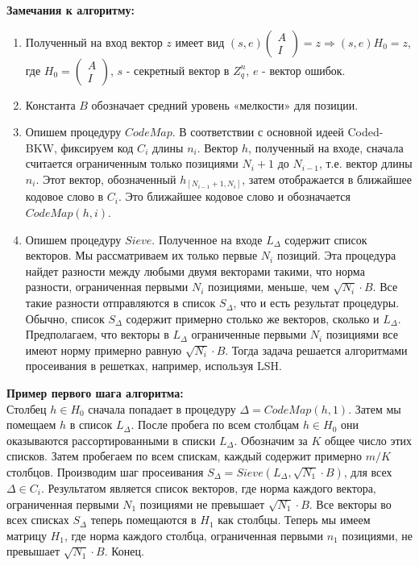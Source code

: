 \documentclass[a4paper,11pt]{article}
\begin{document}
\textbf{Замечания к алгоритму:}\\
\begin{enumerate}
\item Полученный на вход вектор $z$ имеет вид $(s,e)\begin{pmatrix} A\\ I \end{pmatrix} = z \Rightarrow (s,e)H_0 = z$, где $H_0 = \begin{pmatrix} A\\ I \end{pmatrix}$, $s$ - секретный вектор в $Z^{n}_q$, $e$ - вектор ошибок.
\item Константа $B$ обозначает средний уровень «мелкости» для позиции.
\item Опишем процедуру $CodeMap$. В соответствии с основной идеей Coded-BKW, фиксируем код $C_i$ длины $n_i$. Вектор $h$, полученный на входе, сначала считается ограниченным только позициями $N_i+1$ до $N_{i-1}$, т.е. вектор длины $n_i$. Этот вектор, обозначенный $h_{[N_{i-1}+1,N_i]}$, затем отображается в ближайшее кодовое слово в $C_i$. Это ближайшее кодовое слово и обозначается $CodeMap(h,i)$.
\item Опишем процедуру $Sieve$. Полученное на входе $L_{\Delta}$ содержит список векторов. Мы рассматриваем их только первые $N_i$ позиций. Эта процедура найдет разности между любыми двумя векторами такими, что норма разности, ограниченная первыми $N_i$ позициями, меньше, чем $\sqrt{N_i}\cdot B$. Все такие разности отправляются в список $S_{\Delta}$, что и есть результат процедуры. Обычно, список $S_{\Delta}$ содержит примерно столько же векторов, сколько и $L_{\Delta}$. Предполагаем, что векторы в $L_{\Delta}$ ограниченные первыми $N_i$ позициями все имеют норму примерно равную $\sqrt{N_i}\cdot B$. Тогда задача решается алгоритмами просеивания в решетках, например, используя LSH.
\end{enumerate}

\textbf{Пример первого шага алгоритма:}\\
Столбец $h \in H_0$ сначала попадает в процедуру $\Delta=CodeMap(h,1)$. Затем мы помещаем $h$ в список $L_{\Delta}$. После пробега по всем столбцам $h \in H_0$ они оказываются рассортированными в списки $L_{\Delta}$. Обозначим за $K$ общее число этих списков. Затем пробегаем по всем спискам, каждый содержит примерно $m/K$ столбцов. Производим шаг просеивания  $S_{\Delta} = Sieve(L_{\Delta}, \sqrt{N_1}\cdot B)$, для всех $\Delta \in C_i$. Результатом является список векторов, где норма каждого вектора, ограниченная первыми $N_1$ позициями не превышает $\sqrt{N_1}\cdot B$. Все векторы во всех списках $S_{\Delta}$ теперь помещаются в $H_1$ как столбцы. Теперь мы имеем матрицу $H_1$, где норма каждого столбца, ограниченная первыми $n_1$ позициями, не превышает $\sqrt{N_1}\cdot B$. Конец.
\end{document}
